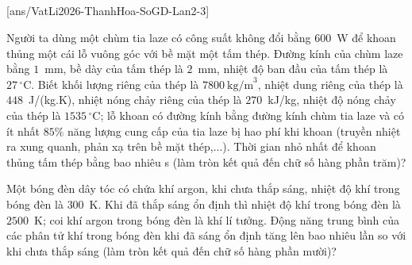 	\subsection*{}
	\setcounter{ex}{0}
	[ans/VatLi2026-ThanhHoa-SoGD-Lan2-3]

	\begin{ex}%
		Người ta dùng một chùm tia laze có công suất không đổi bằng $600$~W để khoan thủng một cái lỗ vuông góc với bề mặt một tấm thép. Đường kính của chùm laze bằng $1$~mm, bề dày của tấm thép là $2$~mm, nhiệt độ ban đầu của tấm thép là $27\,^\circ\text{C}$. Biết khối lượng riêng của thép là $7800~\text{kg/m}^3$, nhiệt dung riêng của thép là $448$~J/(kg.K), nhiệt nóng chảy riêng của thép là $270$~kJ/kg, nhiệt độ nóng chảy của thép là $1535\,^\circ\text{C}$; lỗ khoan có đường kính bằng đường kính chùm tia laze và có ít nhất $85\%$ năng lượng cung cấp của tia laze bị hao phí khi khoan (truyền nhiệt ra xung quanh, phản xạ trên bề mặt thép,...). Thời gian nhỏ nhất để khoan thủng tấm thép bằng bao nhiêu s (làm tròn kết quả đến chữ số hàng phần trăm)?
		\par
	\end{ex}

	\begin{ex}%
		Một bóng đèn dây tóc có chứa khí argon, khi chưa thắp sáng, nhiệt độ khí trong bóng đèn là $300$~K. Khi đã thắp sáng ổn định thì nhiệt độ khí trong bóng đèn là $2500$~K; coi khí argon trong bóng đèn là khí lí tưởng. Động năng trung bình của các phân tử khí trong bóng đèn khi đã sáng ổn định tăng lên bao nhiêu lần so với khi chưa thắp sáng (làm tròn kết quả đến chữ số hàng phần mười)?
		\par
	\end{ex}

